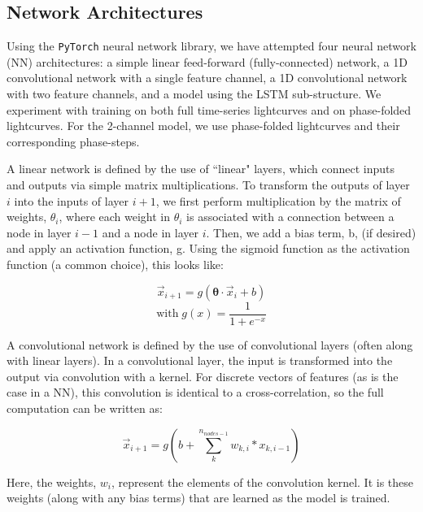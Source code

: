 \documentclass{article}
\begin{document}
\subsection{Network Architectures}
\label{subsec:types}
Using the \texttt{PyTorch} neural network library, we have attempted four neural network (NN) architectures: a simple linear feed-forward (fully-connected) network, a 1D convolutional network with a single feature channel, a 1D convolutional network with two feature channels, and a model using the LSTM sub-structure. We experiment with training on both full time-series lightcurves and on phase-folded lightcurves. For the 2-channel model, we use phase-folded lightcurves and their corresponding phase-steps.

A linear network is defined by the use of ``linear" layers, which connect inputs and outputs via simple matrix multiplications. To transform the outputs of layer $i$ into the inputs of layer $i+1$, we first perform multiplication by the matrix of weights, $\theta_i$, where each weight in $\theta_i$ is associated with a connection between a node in layer $i-1$ and a node in layer $i$. Then, we add a bias term, b, (if desired) and apply an activation function, g. Using the sigmoid function as the activation function (a common choice), this looks like:

\begin{equation}
  \vec x_{i+1} = g(\mathbf{\theta} \cdot \vec x_i + b)
\end{equation}
\begin{equation}
  \mathrm{with} \;g(x) = \frac{1}{1+e^{-x}}
\end{equation}


A convolutional network is defined by the use of convolutional layers (often along with linear layers). In a convolutional layer,  the input is transformed into the output via convolution with a kernel. For discrete vectors of features (as is the case in a NN), this convolution is identical to a cross-correlation, so the full computation can be written as:

\begin{equation}
  \vec x_{i+1} = g(b + \sum_{k}^{n_{nodes - 1}} w_{k,i} \ast x_{k,i-1})
\end{equation}

\noindent Here, the weights, $w_i$, represent the elements of the convolution kernel. It is these weights (along with any bias terms) that are learned as the model is trained.
\end{document}
